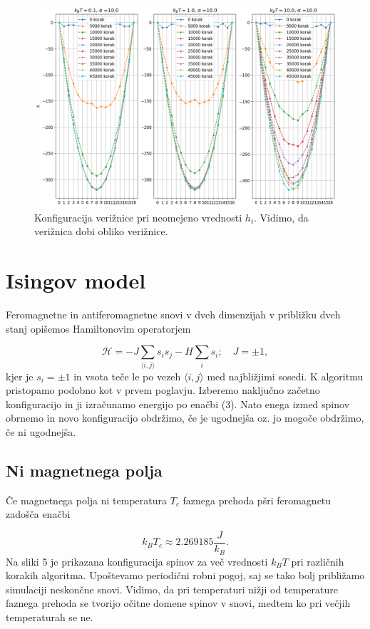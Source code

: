 \documentclass[slovene,11pt,a4paper]{article}
\begin{document}
\newpage

\begin{figure}[h!]
\centering
\includegraphics[width=\linewidth]{veriznica4.png}
\caption{Konfiguracija verižnice pri neomejeno vrednosti $h_i$. Vidimo, da verižnica dobi obliko verižnice.}
\end{figure}

\section{Isingov model}

Feromagnetne in antiferomagnetne snovi v dveh dimenzijah v približku dveh stanj opišemos Hamiltonovim operatorjem

\begin{equation}
\mathcal{H} = -J \sum_{\langle i,j \rangle} s_i s_j - H \sum_i s_i; \quad J = \pm 1,
\end{equation}
kjer je $s_i = \pm 1$ in vsota teče le po vezeh $\langle i,j \rangle$ med najbližjimi sosedi. K algoritmu pristopamo podobno kot v prvem poglavju. Izberemo naključno začetno konfiguracijo in ji izračunamo energijo po enačbi (3). Nato enega izmed spinov obrnemo in novo konfiguracijo obdržimo, če je ugodnejša oz. jo mogoče obdržimo, če ni ugodnejša.

\subsection{Ni magnetnega polja}

Če magnetnega polja ni temperatura $T_c$ faznega prehoda pšri feromagnetu zadošča enačbi

\begin{equation}
k_B T_c \approx 2.269185 \frac{J}{k_B}.
\end{equation}
Na sliki 5 je prikazana konfiguracija spinov za več vrednosti $k_BT$ pri različnih korakih algoritma. Upoštevamo periodični robni pogoj, saj se tako bolj približamo simulaciji neskončne snovi. Vidimo, da pri temperaturi nižji od temperature faznega prehoda se tvorijo očitne domene spinov v snovi, medtem ko pri večjih temperaturah se ne.
\end{document}
